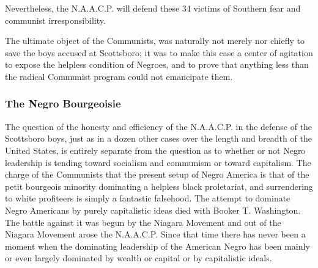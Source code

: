\documentclass[letterpaper,10pt,english]{jupyterBook}
\begin{document}
\sphinxAtStartPar
Nevertheless, the N.A.A.C.P. will defend these 34 victims of Southern fear and communist irresponsibility.

\sphinxAtStartPar
The ultimate object of the Communists, was naturally not merely nor chiefly to save the boys accused at Scottsboro; it was to make this case a center of agitation to expose the helpless condition of Negroes, and to prove that anything less than the radical Communist program could not emancipate them.


\subsubsection{The Negro Bourgeoisie}
\label{\detokenize{Volumes/38/09/negro_and_communism:the-negro-bourgeoisie}}
\sphinxAtStartPar
The question of the honesty and efficiency of the N.A.A.C.P. in the defense of the Scottsboro boys, just as in a dozen other cases over the length and breadth of the United States, is entirely separate from the question as to whether or not Negro leadership is tending toward socialism and communism or toward capitalism.
The charge of the Communists that the present set\sphinxhyphen{}up of Negro America is that of the petit bourgeois minority dominating a helpless black proletariat, and surrendering to white profiteers is simply a fantastic falsehood. The attempt to dominate Negro Americans by purely capitalistic ideas died with Booker T. Washington. The battle against it was begun by the Niagara Movement and out of the Niagara Movement arose the N.A.A.C.P. Since that time there has never been a moment when the dominating leadership of the American Negro has been mainly or even largely dominated by wealth or capital or by capitalistic ideals.
\end{document}
